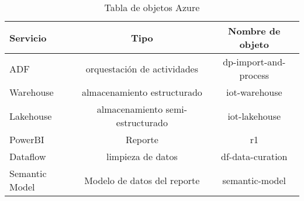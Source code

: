 \begin{table}[h]
	\centering
	\caption[caption corto]{Tabla de objetos Azure}
	\begin{tabular}{l c c}    
		\toprule
		\textbf{Servicio} & \textbf{Tipo} & \textbf{Nombre de objeto}  \\
		\midrule
		   ADF & orquestación de actividades & dp-import-and-process \\		
		 Warehouse & almacenamiento estructurado & iot-warehouse \\		
		 Lakehouse & almacenamiento semi-estructurado & iot-lakehouse \\		
		 PowerBI & Reporte & r1 \\	
		 Dataflow & limpieza de datos & df-data-curation \\		
		 Semantic Model & Modelo de datos del reporte & semantic-model \\		
		

		\bottomrule
		\hline
	\end{tabular}
	\label{tab:peces}
\end{table}




